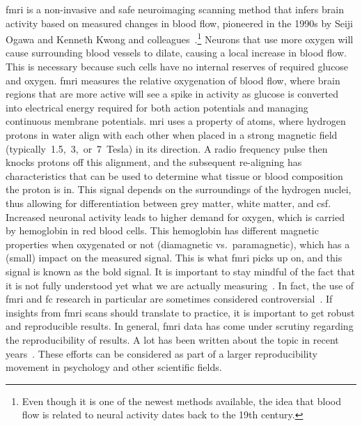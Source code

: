 \gls{fmri} is a non-invasive and safe neuroimaging scanning method that infers brain activity based on measured changes in blood flow, pioneered in the 1990s by Seiji Ogawa and Kenneth Kwong and colleagues~\parencite[see][for a historical perspective]{Raichle1998}.\footnote{Even though it is one of the newest methods available, the idea that blood flow is related to neural activity dates back to the 19th century.}
%
Neurons that use more oxygen will cause surrounding blood vessels to dilate, causing a local increase in blood flow.
This is necessary because such cells have no internal reserves of required glucose and oxygen.
\gls{fmri} measures the relative oxygenation of blood flow, where brain regions that are more active will see a spike in activity as glucose is converted into electrical energy required for both action potentials and managing continuous membrane potentials.
\gls{mri} uses a property of atoms, where hydrogen protons in water align with each other when placed in a strong magnetic field (typically~1.5,~3,~or~7~Tesla) in its direction.
A radio frequency pulse then knocks protons off this alignment, and the subsequent re-aligning has characteristics that can be used to determine what tissue or blood composition the proton is in.
This signal depends on the surroundings of the hydrogen nuclei, thus allowing for differentiation between grey matter, white matter, and \gls{csf}.
%
Increased neuronal activity leads to higher demand for oxygen, which is carried by hemoglobin in red blood cells.
This hemoglobin has different magnetic properties when oxygenated or not (diamagnetic vs.~paramagnetic), which has a (small) impact on the measured signal.
This is what \gls{fmri} picks up on, and this signal is known as the \gls{bold} signal.
%
It is important to stay mindful of the fact that it is not fully understood yet what we are actually measuring~\parencite{Logothetis2004, Cole2010}.
In fact, the use of \gls{fmri} and \gls{fc} research in particular are sometimes considered controversial~\parencite{Mehler2018}.
If insights from \gls{fmri} scans should translate to practice, it is important to get robust and reproducible results.
In general, \gls{fmri} data has come under scrutiny regarding the reproducibility of results.
A lot has been written about the topic in recent years~\parencite[see e.g.][]{Kriegeskorte2009, Gilmore2017, Poldrack2017, Botvinik-Nezer2020, Lindquist2020, Elliott2021, Aquino2022}.
These efforts can be considered as part of a larger reproducibility movement in psychology and other scientific fields.
